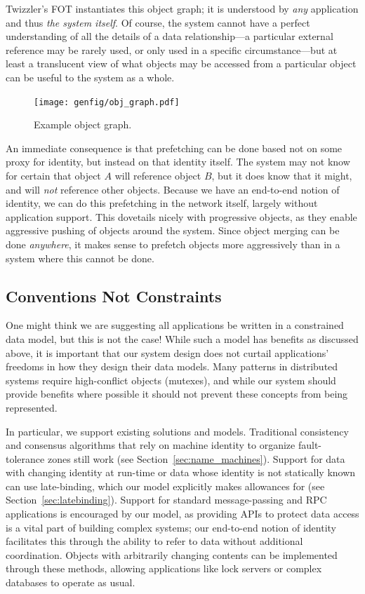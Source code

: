 Twizzler's FOT instantiates this object graph; it is understood by \emph{any} application
and thus \emph{the system itself}.
Of course, the system cannot have a
perfect understanding of all the details of a data relationship---a particular external reference
may be rarely used, or only used in a specific circumstance---but at least a translucent view of
what objects may be accessed from a particular object can be useful to the system as a whole.

\begin{figure}
    \centering
    \texttt{[image: genfig/obj\_graph.pdf]}
    \caption[Example object graph]{Example object graph.}
    \label{fig:ograph}
\end{figure}

An immediate consequence is that prefetching can be done based not on some proxy for identity,
but instead on that identity itself. The system may not know for certain that object $A$ will
reference object $B$, but it does know that it might, and will \emph{not} reference other objects.
Because we have an end-to-end notion of identity, we can do this prefetching in the network itself,
largely without application support.
This dovetails nicely with progressive objects, as they enable aggressive pushing of objects around
the system. Since object merging can be done \emph{anywhere}, it makes sense to prefetch objects
more aggressively than in a system where this cannot be done.


\subsection{Conventions Not Constraints}

One might think we are suggesting all applications be written in a constrained data
model, but this is not the case! While such a model has benefits as discussed above, it is
important that our system design does not curtail applications' freedoms in how they design their
data models. Many patterns in distributed systems require high-conflict objects (\eg mutexes), and
while our system should provide benefits where possible it should not prevent these concepts from
being represented.

In particular, we support existing solutions and models. Traditional consistency and
consensus algorithms that rely on machine identity to organize fault-tolerance zones still work (see
Section~\ref{sec:name_machines}). Support for data with changing identity at run-time or data whose
identity is not statically known can use late-binding, which our model explicitly makes
allowances for (see Section~\ref{sec:latebinding}). Support for standard message-passing and RPC
applications is encouraged by our model, as providing APIs to protect data access is a vital part of
building complex systems; our end-to-end notion of identity facilitates this through the ability to
refer to data without additional coordination. Objects with arbitrarily changing contents can be
implemented through these methods, allowing applications like lock servers or complex databases to
operate as usual.

